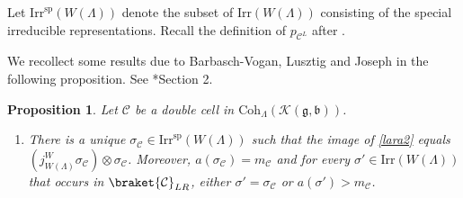 \documentclass[12pt]{amsart}
\newcommand{\CB}{{\mathcal {B}}}
\newcommand{\CC}{{\mathcal {C}}}
\newcommand{\CK}{{\mathcal {K}}}
\newcommand{\g}{\mathfrak g}
\renewcommand{\b}{\mathfrak b}
\numberwithin{equation}{section}
\newtheorem{prop}[thm]{Proposition}
\theoremstyle{remark}
\newtheorem{remark}[thm]{Remark}
\def\Irr{\mathrm{Irr}}
\def\Coh{\mathrm{Coh}}
\begin{document}


Let  $\Irr^{\mathrm{sp}}(W(\Lambda))$ denote the subset of $\Irr(W(\Lambda))$ consisting of the special
irreducible representations. Recall the definition of $p_{\CC^L}$ after .

We recollect some results due to Barbasch-Vogan, Lusztig and Joseph in the following proposition. See  \cite{BV2}*{Section 2}.


\begin{prop}\label{cell00}\label{dcrep} Let $\CC$ be a double cell in $\Coh_{\Lambda}( \CK(\g,\b))$.
\begin{enumerate}[label=(\alph*),wide=0pt]
\item
 There is a unique $\sigma_\CC \in \Irr^{\mathrm{sp}}(W(\Lambda))$
 such that  the image of \eqref{lara2} equals
 $\left(j_{W(\Lambda)}^W\sigma_\CC\right)\otimes \sigma_\CC$.
Moreover, $a(\sigma_\CC) = m_\CC$ and for every $\sigma'\in \Irr(W(\Lambda))$ that occurs
in $\braket{\CC}_{LR}$, either $\sigma'=\sigma_\CC$ or $a(\sigma')>m_\CC$.

\end{enumerate}
\end{prop}
\end{document}
